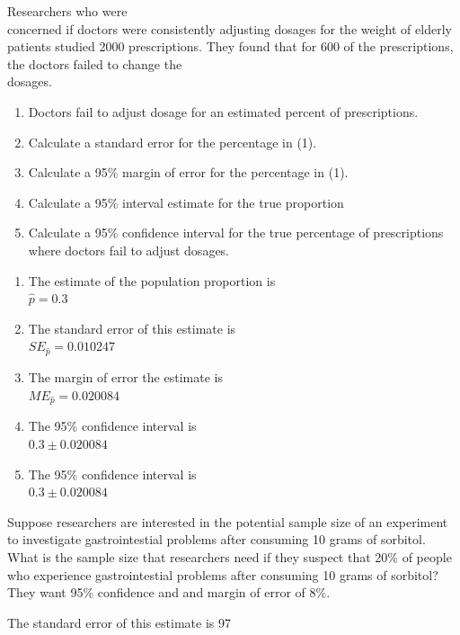 \documentclass[11pt, chapterprefix=true]{scrbook}\usepackage[]{graphicx}\usepackage[]{color}
\begin{document}
\begin{exercises}
\begin{exercise} %

Researchers who were \\ concerned if doctors were consistently adjusting dosages for the weight of elderly patients studied 2000 prescriptions.  They found that for 600 of the  prescriptions, the doctors failed to change the \\ dosages.

\begin{enumerate}
\item	Doctors fail to adjust dosage for an estimated \underline{\phantom{xxxxxxxx}}  percent of prescriptions.
\item	Calculate a standard error for the percentage in (1).
\item	Calculate a 95\% margin of error for the percentage in (1).
\item	Calculate a 95\% interval estimate for the true proportion
\item	Calculate a 95\% confidence interval for the true percentage of prescriptions  \\ where doctors fail to adjust dosages.
\end{enumerate}
\end{exercise}
\begin{solution} %


\begin{enumerate}
\item	The estimate of the population proportion is \\ $\hat{p} = 0.3$
\item	The standard error of this estimate is \\ $SE_{\hat{p}} = 0.010247$
\item The margin of error the estimate is \\ $ME_{\hat{p}} = 0.020084$
\item	The 95\% confidence interval is \\ $0.3 \pm 0.020084$
\item	The 95\% confidence interval is \\ $0.3 \pm 0.020084$
\end{enumerate}
\end{solution}

\begin{exercise} %

Suppose researchers are interested in the potential sample size of an experiment to investigate gastrointestial problems after consuming 10 grams of sorbitol.  What is the sample size that researchers need if they suspect that 20\% of people who experience gastrointestial problems after consuming 10 grams of sorbitol?  They want 95\% confidence and and margin of error of 8\%.

\end{exercise}
\begin{solution} %


The standard error of this estimate is 97

\end{solution}

\end{exercises}
\end{document}
